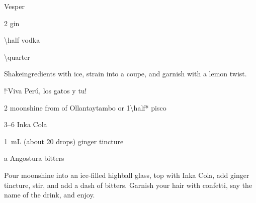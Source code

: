 \begin{Cocktail}{Vesper}
  \begin{Ingredients}
  \item \SI{2}{\oz} gin
  \item \SI{\half}{\oz} vodka
  \item \SI{\quarter}{\oz} \Lillet
  \end{Ingredients}
  
  \begin{Instructions}
	Shake\footnotemark[2] ingredients with ice, strain into a coupe, and garnish with a lemon twist.
  \end{Instructions}
\end{Cocktail}

\begin{Cocktail*}{!`Viva Per\'{u}, los gatos y tu!}
  \begin{Ingredients}
  \item \SI{2}{\oz} moonshine from of Ollantaytambo or \SI{1\half*}{\oz} pisco
  \item \SIrange{3}{6}{\oz} Inka Cola
  \item \SI{1}{\milli\liter} (about 20 drops) ginger tincture
  \item a \si{\dash} Angostura bitters
  \end{Ingredients}
  
  \begin{Instructions}
	
	Pour moonshine into an ice-filled highball glass, top with Inka Cola, add ginger tincture, stir, and add a dash of bitters.  Garnish your hair with confetti, say the name of the drink, and enjoy.
  \end{Instructions}
\end{Cocktail*}

